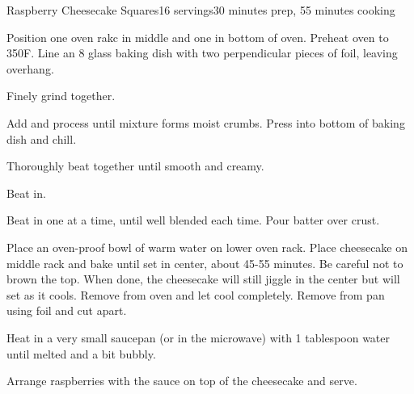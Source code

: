 \documentclass[../Cookbook.tex]{subfiles}
\begin{document}
\begin{recipe}{Raspberry Cheesecake Squares}{16 servings}{30 minutes prep, 55 minutes cooking}

Position one oven rakc in middle and one in bottom of oven. Preheat oven to 350\0F. Line an 8 glass baking dish with two perpendicular pieces of foil, leaving overhang.

Finely grind together.

Add and process until mixture forms moist crumbs. Press into bottom of baking dish and chill.

Thoroughly beat together until smooth and creamy.

Beat in.

Beat in one at a time, until well blended each time. Pour batter over crust.

Place an oven-proof bowl of warm water on lower oven rack. Place cheesecake on middle rack and bake until set in center, about 45-55 minutes. Be careful not to brown the top.
When done, the cheesecake will still jiggle in the center but will set as it cools.
Remove from oven and let cool completely. Remove from pan using foil and cut apart.

Heat in a very small saucepan (or in the microwave) with 1 tablespoon water until melted and a bit bubbly.

Arrange raspberries with the sauce on top of the cheesecake and serve.

\end{recipe}
\end{document}
